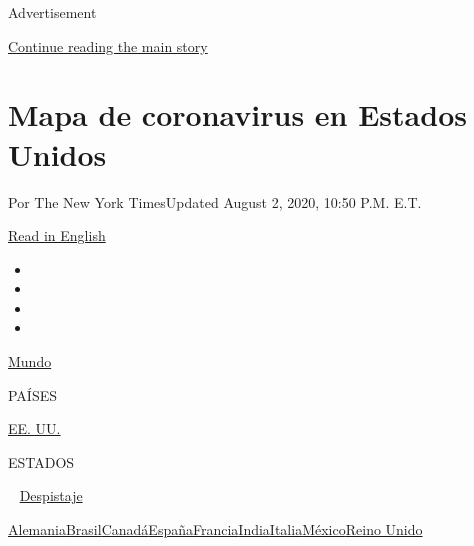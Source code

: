 Advertisement

\protect\hyperlink{after-top}{Continue reading the main story}

\hypertarget{mapa-de-coronavirus-en-estados-unidos}{%
\section{Mapa de coronavirus en Estados
Unidos}\label{mapa-de-coronavirus-en-estados-unidos}}

Por The New York TimesUpdated August 2, 2020, 10:50 P.M. E.T.

\href{https://www.nytimes3xbfgragh.onion/interactive/2020/us/coronavirus-us-cases.html}{Read
in English}

\begin{itemize}
\item
\item
\item
\item
\end{itemize}

\href{https://www.nytimes3xbfgragh.onion/interactive/2020/world/coronavirus-maps.html}{Mundo}~

PAÍSES

\textbar{}
\href{https://www.nytimes3xbfgragh.onion/es/interactive/2020/espanol/mundo/coronavirus-en-estados-unidos.html}{EE.
UU.}~

ESTADOS

~
\href{https://www.nytimes3xbfgragh.onion/interactive/2020/us/coronavirus-testing.html}{Despistaje}

\href{https://www.nytimes3xbfgragh.onion/interactive/2020/world/europe/germany-coronavirus-cases.html}{Alemania}\href{https://www.nytimes3xbfgragh.onion/interactive/2020/world/americas/brazil-coronavirus-cases.html}{Brasil}\href{https://www.nytimes3xbfgragh.onion/interactive/2020/world/canada/canada-coronavirus-cases.html}{Canadá}\href{https://www.nytimes3xbfgragh.onion/interactive/2020/world/europe/spain-coronavirus-cases.html}{España}\href{https://www.nytimes3xbfgragh.onion/interactive/2020/world/europe/france-coronavirus-cases.html}{Francia}\href{https://www.nytimes3xbfgragh.onion/interactive/2020/world/asia/india-coronavirus-cases.html}{India}\href{https://www.nytimes3xbfgragh.onion/interactive/2020/world/europe/italy-coronavirus-cases.html}{Italia}\href{https://www.nytimes3xbfgragh.onion/es/interactive/2020/espanol/america-latina/coronavirus-en-mexico.html}{México}\href{https://www.nytimes3xbfgragh.onion/interactive/2020/world/europe/united-kingdom-coronavirus-cases.html}{Reino
Unido}

